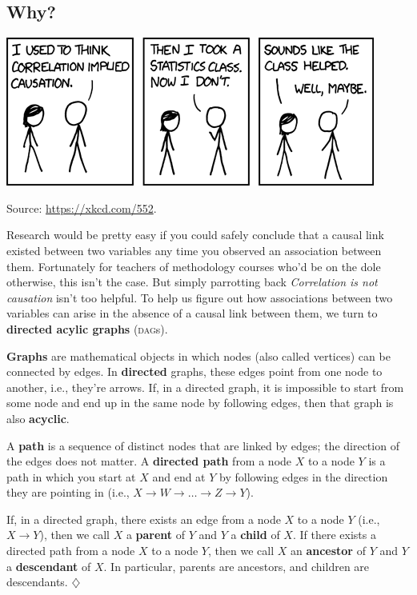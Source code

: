\documentclass[a4paper]{tufte-book}\usepackage[]{graphicx}\usepackage[]{xcolor}
\newcommand{\term}[1]{\textbf{#1}}
\newcommand*{\parend}[1][$\diamondsuit$]{%
\leavevmode\unskip\penalty9999 \hbox{}\nobreak\hfill
    \quad\hbox{#1}%
}
\begin{document}
\subsection{Why?}
\begin{marginfigure}
\includegraphics[width=\textwidth]{figure/correlation}
\caption{Source: \url{https://xkcd.com/552}.}
\label{fig:xkcdcorrelation}
\end{marginfigure}
Research would be pretty easy if you could safely conclude that a causal
link existed between two variables any time you observed an association between
them. Fortunately for teachers of methodology courses who'd be on the dole
otherwise, this isn't the case. But simply parrotting back \emph{Correlation is not causation}
isn't too helpful.
To help us figure out how associations between
two variables can arise in the absence of a causal link between them, we turn
to \term{directed acylic graphs} (\textsc{dag}s).

  \term{Graphs} are mathematical objects in which nodes (also called vertices) can be connected by edges.
  In \term{directed} graphs, these edges point from one node to another, i.e., they're
arrows.
If, in a directed graph, it is impossible to start from some node and
end up in the same node by following edges, then that graph is also \term{acyclic}.

 A \term{path} is a sequence of distinct nodes that are linked by edges;
 the direction of the edges does not matter.
 A \term{directed path} from a node $X$ to a node $Y$ 
 is a path in which you start at $X$ and end at $Y$
 by following edges in the direction they are pointing in
 (i.e., $X \rightarrow W \rightarrow \dots \rightarrow Z \rightarrow Y$).

If, in a directed graph, there exists an edge from a node $X$ to a node $Y$ (i.e., $X \rightarrow Y$),
then we call $X$ a \term{parent} of $Y$ and $Y$ a \term{child} of $X$.
If there exists a directed path from a node $X$ to a node $Y$, then we call 
$X$ an \term{ancestor} of $Y$ and $Y$ a \term{descendant} of $X$.
In particular, parents are ancestors, and children are descendants.
\parend
\end{document}
